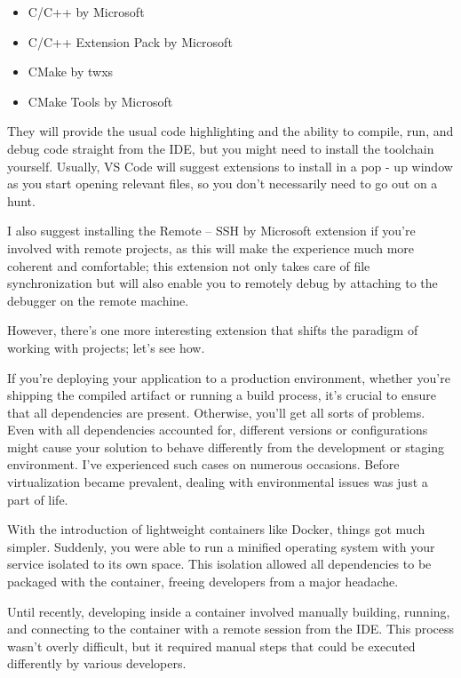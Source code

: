 \begin{itemize}
\item
C/C++ by Microsoft

\item
C/C++ Extension Pack by Microsoft

\item
CMake by twxs

\item
CMake Tools by Microsoft
\end{itemize}

They will provide the usual code highlighting and the ability to compile, run, and debug code straight from the IDE, but you might need to install the toolchain yourself. Usually, VS Code will suggest extensions to install in a pop - up window as you start opening relevant files, so you don’t necessarily need to go out on a hunt.

I also suggest installing the Remote – SSH by Microsoft extension if you’re involved with remote projects, as this will make the experience much more coherent and comfortable; this extension not only takes care of file synchronization but will also enable you to remotely debug by attaching to the debugger on the remote machine.

However, there’s one more interesting extension that shifts the paradigm of working with projects; let’s see how.


If you’re deploying your application to a production environment, whether you’re shipping the compiled artifact or running a build process, it’s crucial to ensure that all dependencies are present. Otherwise, you’ll get all sorts of problems. Even with all dependencies accounted for, different versions or configurations might cause your solution to behave differently from the development or staging environment. I’ve experienced such cases on numerous occasions. Before virtualization became prevalent, dealing with environmental issues was just a part of life.

With the introduction of lightweight containers like Docker, things got much simpler. Suddenly, you were able to run a minified operating system with your service isolated to its own space. This isolation allowed all dependencies to be packaged with the container, freeing developers from a major headache.

Until recently, developing inside a container involved manually building, running, and connecting to the container with a remote session from the IDE. This process wasn’t overly difficult, but it required manual steps that could be executed differently by various developers.

